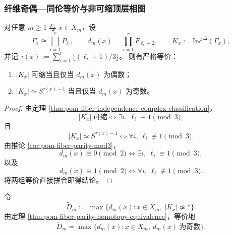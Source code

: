 \subsubsection{纤维奇偶—同伦等价与非可缩顶层相图}\label{subsubsec:pom-fiber-parity-homotopy-noncontractible-phase}

\begin{theorem}[纤维奇偶与同伦型的严格等价]\label{thm:pom-fiber-parity-homotopy-equivalence}
对任意 \(m\ge 1\) 与 \(x\in X_m\)，设
\[
\Gamma_x\cong\bigsqcup_{i=1}^{r}P_{\ell_i},
\qquad
d_m(x)=\prod_{i=1}^{r}F_{\ell_i+2},
\qquad
K_x:=\mathrm{Ind}^{\Delta}(\Gamma_x),
\]
并记
\(
\tau(x):=\sum_{i=1}^{r}\lfloor(\ell_i+1)/3\rfloor
\)。
则有严格等价：
\begin{enumerate}
  \item \(|K_x|\) 可缩当且仅当 \(d_m(x)\) 为偶数；
  \item \(|K_x|\simeq S^{\tau(x)-1}\) 当且仅当 \(d_m(x)\) 为奇数。
\end{enumerate}
\end{theorem}
\begin{proof}
由定理 \ref{thm:pom-fiber-independence-complex-classification}，
\[
|K_x|\ \text{可缩}
\Longleftrightarrow
\exists i,\ \ell_i\equiv 1\pmod 3,
\]
且
\[
|K_x|\simeq S^{\tau(x)-1}
\Longleftrightarrow
\forall i,\ \ell_i\not\equiv 1\pmod 3.
\]
由推论 \ref{cor:pom-fiber-parity-mod3}，
\[
d_m(x)\equiv 0\pmod 2
\Longleftrightarrow
\exists i,\ \ell_i\equiv 1\pmod 3,
\]
以及
\[
d_m(x)\equiv 1\pmod 2
\Longleftrightarrow
\forall i,\ \ell_i\not\equiv 1\pmod 3.
\]
将两组等价直接拼合即得结论。
\end{proof}

\begin{definition}[非可缩最大纤维]\label{def:pom-max-noncontractible-fiber}
令
\[
\widetilde D_m
:=
\max\{d_m(x):x\in X_m,\ |K_x|\not\simeq\ast\}.
\]
由定理 \ref{thm:pom-fiber-parity-homotopy-equivalence}，等价地
\[
\widetilde D_m
=
\max\{d_m(x):x\in X_m,\ d_m(x)\ \text{为奇数}\}.
\]
\end{definition}

